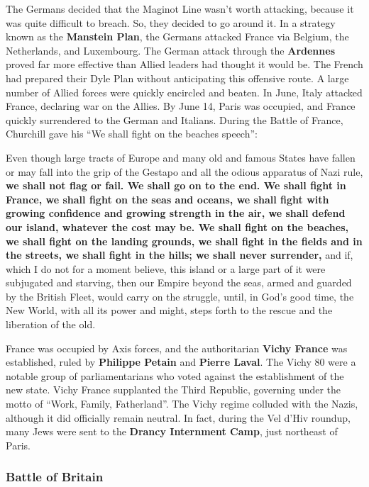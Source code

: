 The Germans decided that the Maginot Line wasn't worth attacking, because it was quite difficult to breach.
So, they decided to go around it.
In a strategy known as the \textbf{Manstein Plan},
the Germans attacked France via Belgium, the Netherlands, and Luxembourg.
The German attack through the \textbf{Ardennes} proved far more effective than Allied leaders had thought it would be.
The French had prepared their Dyle Plan without anticipating this offensive route.
A large number of Allied forces were quickly encircled and beaten.
In June, Italy attacked France, declaring war on the Allies.
By June 14, Paris was occupied, and France quickly surrendered to the German and Italians.
During the Battle of France, Churchill gave his ``We shall fight on the beaches speech'':
\begin{quoting}
  Even though large tracts of Europe and many old and famous States have fallen
  or may fall into the grip of the Gestapo and all the odious apparatus of Nazi rule,
  \textbf{%
    we shall not flag or fail.
    We shall go on to the end.
    We shall fight in France, we shall fight on the seas and oceans,
    we shall fight with growing confidence and growing strength in the air,
    we shall defend our island, whatever the cost may be.
    We shall fight on the beaches,
    we shall fight on the landing grounds,
    we shall fight in the fields and in the streets,
    we shall fight in the hills; we shall never surrender,
  }
  and if, which I do not for a moment believe,
  this island or a large part of it were subjugated and starving,
  then our Empire beyond the seas, armed and guarded by the British Fleet, would carry on the struggle,
  until, in God's good time, the New World, with all its power and might,
  steps forth to the rescue and the liberation of the old.
\end{quoting}

France was occupied by Axis forces, and the authoritarian \textbf{Vichy France} was established,
ruled by \textbf{Philippe Petain} and \textbf{Pierre Laval}.
The Vichy 80 were a notable group of parliamentarians who voted against the establishment of the new state.
Vichy France supplanted the Third Republic, governing under the motto of ``Work, Family, Fatherland''.
The Vichy regime colluded with the Nazis, although it did officially remain neutral.
In fact, during the Vel d'Hiv roundup, many Jews were sent to the \textbf{Drancy Internment Camp},
just northeast of Paris.

\subsubsection*{Battle of Britain}


